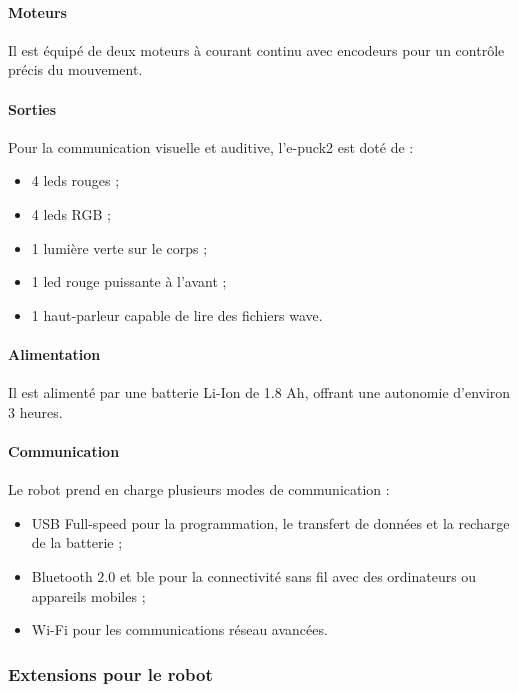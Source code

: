 \paragraph{Moteurs}
Il est équipé de deux moteurs à courant continu avec encodeurs pour un contrôle précis du mouvement.  

\paragraph{Sorties}
Pour la communication visuelle et auditive, l'e-puck2 est doté de : 
\begin{itemize}
    \item 4 \acrshort{led}s rouges ;
    \item 4 \acrshort{led}s RGB ;
    \item 1 lumière verte sur le corps ;
    \item 1 \acrshort{led} rouge puissante à l'avant ;
    \item 1 haut-parleur capable de lire des fichiers \acrshort{wave}.
\end{itemize}

\paragraph{Alimentation}
Il est alimenté par une batterie Li-Ion de 1.8 Ah, offrant une autonomie d'environ 3 heures.

\paragraph{Communication}
Le robot prend en charge plusieurs modes de communication : 
\begin{itemize} 
    \item USB Full-speed pour la programmation, le transfert de données et la recharge de la batterie ;
    \item Bluetooth 2.0 et \acrfull{ble} pour la connectivité sans fil avec des ordinateurs ou appareils mobiles ;
    \item Wi-Fi pour les communications réseau avancées.
\end{itemize}

\subsubsection{Extensions pour le robot}

